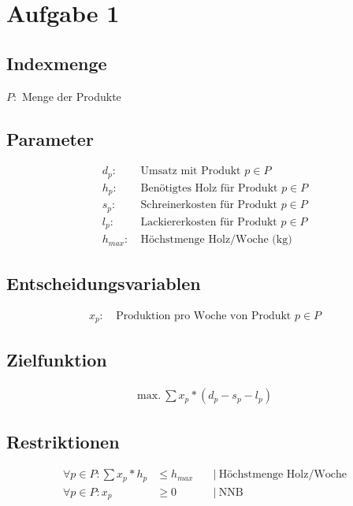 \documentclass[a4paper,11pt]{article}
\begin{document}
\raggedright %

\section*{Aufgabe 1}

\subsection*{Indexmenge}

$P:$ Menge der Produkte \\

\subsection*{Parameter}

\begin{align*}
  d_p :&~ \text{Umsatz mit Produkt $p \in P$} \\
  h_p :&~ \text{Benötigtes Holz für Produkt $p \in P$} \\
  s_p :&~ \text{Schreinerkosten für Produkt $p \in P$} \\
  l_p :&~ \text{Lackiererkosten für Produkt $p \in P$} \\
  h_{max} :&~ \text{Höchstmenge Holz/Woche (kg)}
\end{align*}

\subsection*{Entscheidungsvariablen}

\begin{align*}
  x_p :&~ \text{Produktion pro Woche von Produkt $p \in P$}
\end{align*}

\subsection*{Zielfunktion}

\begin{align*}
  \text{max.} ~ \sum x_p * (d_p - s_p - l_p)
\end{align*}

\subsection*{Restriktionen}

\begin{align*}
  \forall p \in P : \sum x_p * h_p &\le h_{max} &&~\big|~ \text{Höchstmenge Holz/Woche} \\
  \forall p \in P : x_p &\ge 0 &&~\big|~ \text{NNB} \\
\end{align*}
\end{document}
